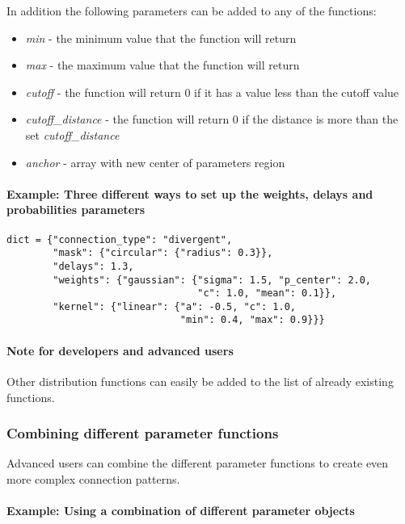 \documentclass{article}
\begin{document}
In addition the following parameters can be added to any of the functions:

\begin{itemize}
\item \emph{min} - the minimum value that the function will return
\item \emph{max} - the maximum value that the function will return
\item \emph{cutoff} - the function will return 0 if it has a value less than the cutoff value
\item \emph{cutoff\_distance} - the function will return 0 if the distance is more than the set \emph{cutoff\_distance}
\item \emph{anchor} - array with new center of parameters region
\end{itemize}

\paragraph{Example: Three different ways to set up the weights, delays and probabilities parameters}

\begin{verbatim}
dict = {"connection_type": "divergent",
        "mask": {"circular": {"radius": 0.3}},
        "delays": 1.3,
        "weights": {"gaussian": {"sigma": 1.5, "p_center": 2.0,
                                 "c": 1.0, "mean": 0.1}},
        "kernel": {"linear": {"a": -0.5, "c": 1.0, 
                              "min": 0.4, "max": 0.9}}}
\end{verbatim}

\paragraph{Note for developers and advanced users}

Other distribution functions can easily be added to the list of already existing functions.

\subsubsection{Combining different parameter functions}

Advanced users can combine the different parameter functions to create even more complex connection patterns.

\paragraph{Example: Using a combination of different parameter objects}
\end{document}
